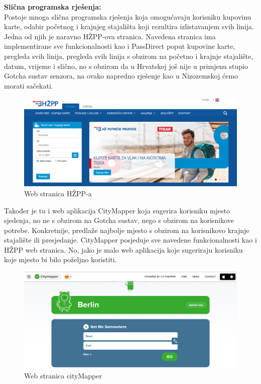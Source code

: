 \textbf{Slična programska rješenja:}\\
Postoje mnoga slična programska rješenja koja omogućavaju korisniku kupovinu karte, odabir početnog i krajnjeg stajališta koji rezultira izlistavanjem svih linija. Jedna od njih je naravno HŽPP-ova stranica. Navedena stranica ima implementirane sve funkcionalnosti kao i PassDirect poput kupovine karte, pregleda svih linija, pregleda svih linija s obzirom na početno i krajnje stajalište, datum, vrijeme i slično, no s obzirom da u Hrvatskoj još nije u primjenu stupio Gotcha sustav senzora, na ovako napredno rješenje kao u Nizozemskoj ćemo morati sačekati. 
\begin{figure}[H]
					\centering
					\includegraphics[width=1\linewidth]{"slike/hzpp.png"}
					\caption{Web stranica HŽPP-a}
					\label{fig:hzpp}
				\end{figure}
Također je tu i web aplikacija CityMapper koja sugerira korisniku mjesto sjedenja, no ne s obzirom na Gotcha sustav, nego s obzirom na korisnikove potrebe. Konkretnije, predlaže najbolje mjesto s obzirom na korisnikovo krajnje stajalište ili presjedanje. CityMapper posjeduje sve navedene funkcionalnosti kao i HŽPP web stranica.
 No, jako je malo web aplikacija koje sugeriraju korisniku koje mjesto bi bilo poželjno koristiti. 
 \begin{figure}[H]
					\centering
					\includegraphics[width=1\linewidth]{"slike/cityMapper.png"}
					\caption{Web stranica cityMapper}
					\label{fig:cityMapper}
				\end{figure}



